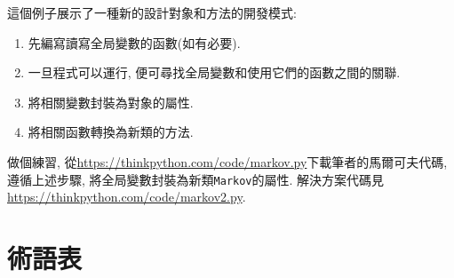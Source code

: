 \documentclass[10pt]{book}
\begin{document}
這個例子展示了一種新的設計對象和方法的開發模式:

\begin{enumerate}

\item 先編寫讀寫全局變數的函數(如有必要).

\item 一旦程式可以運行, 便可尋找全局變數和使用它們的函數之間的關聯.

\item 將相關變數封裝為對象的屬性.

\item 將相關函數轉換為新類的方法.

\end{enumerate}

做個練習, 從\url{https://thinkpython.com/code/markov.py}下載筆者的馬爾可夫代碼, 
遵循上述步驟, 將全局變數封裝為新類{\tt Markov}的屬性. 
解決方案代碼見\url{https://thinkpython.com/code/markov2.py}.



\section{術語表}
\end{document}

